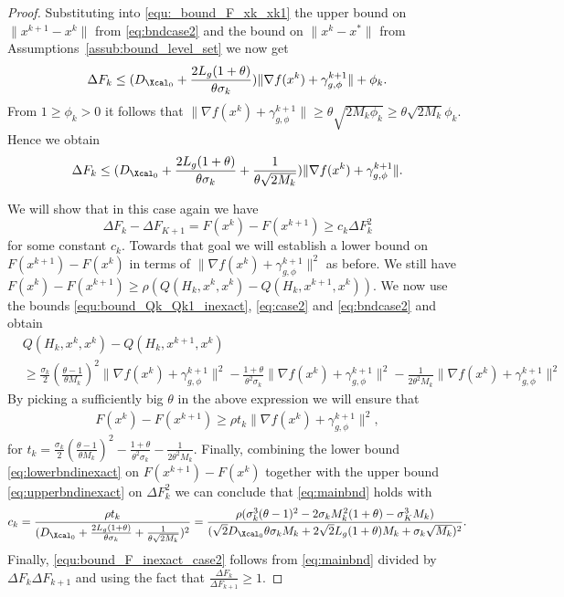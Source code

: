 \documentclass[11pt]{article}
\numberwithin{equation}{section}
\begin{document}
\begin{proof}
	Substituting into \eqref{equ:_bound_F_xk_xk1} the upper bound on  $\| x^{k+1} - x^k\|$ from \eqref{eq:bndcase2} and the bound on $\|x^{k} - x^*\|$ from Assumptions~\ref{assub:bound_level_set} we now get  
	\begin{align*}
		\Delta F_k\leq 
		(D_{\Xcal_0} + \frac{2L_g(1+\theta)}{\theta\sigma_k})\|\nabla f(x^k)+\gamma_{g, \phi}^{k+1}\| + \phi_k.
	\end{align*}
	From $1 \geq \phi_k > 0$ it follows that $\| \nabla f(x^k) + \gamma_{g, \phi}^{k+1} \| \geq \theta \sqrt{2M_k\phi_k} \geq \theta \sqrt{2M_k}\phi_k$. Hence we obtain
	\begin{align}
	\label{eq:upperbndinexact}
		\Delta F_k\leq 
		(D_{\Xcal_0} + \frac{2L_g(1+\theta)}{\theta\sigma_k} + \frac{1}{\theta\sqrt{2M_k}})\|\nabla f(x^k)+\gamma_{g, \phi}^{k+1}\|.
	\end{align}
	 
	We will  show that in this case again we have 
	\begin{equation}\label{eq:mainbnd}
		\Delta F_k - \Delta F_{K+1} = 
		 F(x^k) - F(x^{k+1})\geq c_k \Delta F_k^2
	\end{equation} for some constant $c_k$.  
	Towards that goal  we will establish a lower bound on $F(x^{k+1})-F(x^k)$ in terms of $\|\nabla f(x^k)+\gamma_{g, \phi}^{k+1}\|^2$ as before.
	We still have $F(x^{k})-F(x^{k+1})\geq \rho (Q(H_k, x^{k}, x^k)-Q(H_k,x^{k+1}, x^k))$. 
	We now use the bounds \eqref{equ:bound_Qk_Qk1_inexact}, \eqref{eq:case2} and \eqref{eq:bndcase2} and obtain
	\begin{align*}
		&Q(H_k,x^k,x^k) - Q(H_k,x^{k+1}, x^k) \\
		&\geq \frac{\sigma_k}{2}(\frac{\theta-1}{\theta M_k})^2 \| \nabla f(x^k) + \gamma_{g, \phi}^{k+1} \|^2
		- \frac{1+\theta}{\theta^2\sigma_k}\| \nabla f(x^k) + \gamma_{g, \phi}^{k+1} \|^2 
		- \frac{1}{2\theta^2M_k}\| \nabla f(x^k) + \gamma_{g, \phi}^{k+1} \|^2
	\end{align*}
	By picking a sufficiently big $\theta$ in the above expression we will ensure that 
	\begin{align}
	\label{eq:lowerbndinexact}
	    F(x^k) - F(x^{k+1})\geq \rho t_k \| \nabla f(x^k) + \gamma_{g, \phi}^{k+1} \|^2,
	\end{align}
	for $t_k=\frac{\sigma_k}{2}(\frac{\theta-1}{\theta M_k})^2 - \frac{1+\theta}{\theta^2\sigma_k}- \frac{1}{2\theta^2M_k}$. 
	Finally, combining the lower bound \eqref{eq:lowerbndinexact} on $F(x^{k+1})-F(x^k)$ together with the upper bound \eqref{eq:upperbndinexact}
	on $\Delta F_k^2$  we can conclude that \eqref{eq:mainbnd} holds with 
	\begin{align*}
		c_k= \frac{\rho t_k}{(D_{\Xcal_0} + \frac{2L_g(1+\theta)}{\theta\sigma_k} + \frac{1}{\theta\sqrt{2M_k}})^2} = \frac{\rho(\sigma_k^3(\theta-1)^2 - 2\sigma_kM_k^2(1+\theta) - \sigma_K^3M_k )}{(\sqrt{2}D_{\Xcal_0}\theta\sigma_kM_k + 2\sqrt{2}L_g(1+\theta)M_k + \sigma_k\sqrt{M_k} )^2}.    
	\end{align*}
	Finally, \eqref{equ:bound_F_inexact_case2} follows from \eqref{eq:mainbnd} divided by $\Delta F_k\Delta F_{k+1}$ and using the fact that $\frac{\Delta F_k}{\Delta F_{k+1}} \geq 1$.
	

\end{proof}
\end{document}
